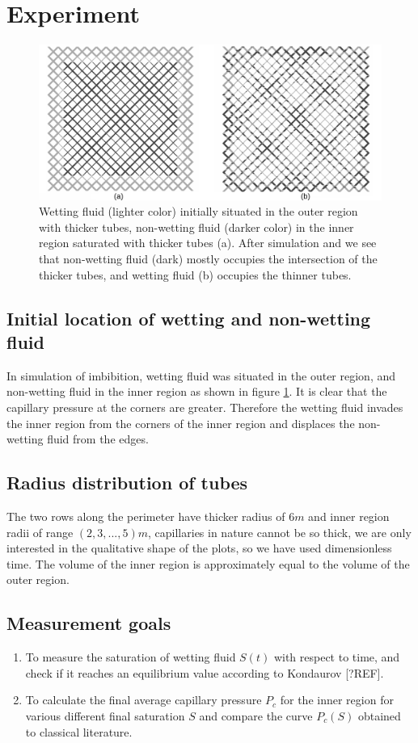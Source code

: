 \documentclass[
	12pt
] {article}
\begin{document}
\section{Experiment}
	\begin{figure}
		\centering
		\includegraphics[width=\textwidth]{fig_3_2200x1000}
		\caption{Wetting fluid (lighter color) initially situated in the outer region with thicker tubes, non-wetting fluid (darker color) in the inner region saturated with thicker tubes (a). After simulation and we see that non-wetting fluid (dark) mostly occupies the intersection of the thicker tubes, and wetting fluid (b) occupies the thinner tubes.}
		\label{fig:3}
	\end{figure}

\subsection{Initial location of wetting and non-wetting fluid}
	In simulation of imbibition, wetting fluid was situated in the outer region, and non-wetting fluid in the inner region as shown in figure \ref{fig:3}. It is clear that the capillary pressure at the corners are greater. Therefore the wetting fluid invades the inner region from the corners of the inner region and displaces the non-wetting fluid from the edges.
	
\subsection{Radius distribution of tubes}
	The two rows along the perimeter have thicker radius of $6 m$ and inner region radii of range $(2, 3, ..., 5) m$, capillaries in nature cannot be so thick, we are only interested in the qualitative shape of the plots, so we have used dimensionless time. The volume of the inner region is approximately equal to the volume of the outer region.
	
\subsection{Measurement goals}
\begin{enumerate}
	\item To measure the saturation of wetting fluid $S(t)$ with respect to time, and check if it reaches an equilibrium value according to Kondaurov [?REF].
	\item To calculate the final average capillary pressure $P_c$ for the inner region for various different final saturation $S$ and compare the curve $P_c(S)$ obtained to classical literature.
\end{enumerate}
\end{document}
